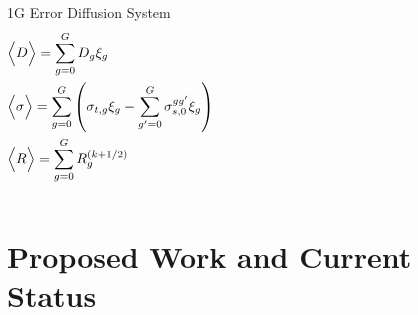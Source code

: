 \documentclass[compress,10pt]{beamer}
\begin{document}
\begin{frame}[t]
{\begin{columns}
\begin{block}{1G Error Diffusion System}
{\begin{equation*}
\begin{aligned}
&\Big< D \Big> = \sum\displaylimits_{g=0}^{G} D_g \xi_g \\
&\Big< \sigma \Big> = \sum\displaylimits_{g=0}^{G} \left(  \sigma_{t,g} \xi_g - \sum\displaylimits_{g'=0}^{G} \sigma_{s,0}^{gg'} \xi_g \right) \\
&\Big< R \Big> = \sum\displaylimits_{g=0}^{G} R_g^{(k+1/2)}
\end{aligned}
\end{equation*}
}\end{block}
\end{columns}
}
\end{frame}
%
%
\section{Proposed Work and Current Status}
\end{document}
